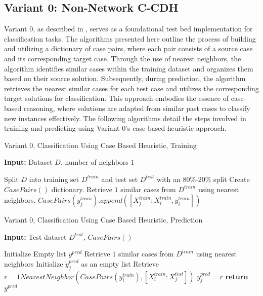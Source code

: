 \documentclass[a4paper, 12pt]{report}
\begin{document}
\subsection{Variant 0: Non-Network C-CDH}

Variant 0, as described in \cite{ye2021learning}, serves as a foundational test bed implementation for classification tasks. 
The algorithms presented here outline the process of building and utilizing a dictionary of case pairs, where each pair consists of a source case and its corresponding target case. 
Through the use of nearest neighbors, the algorithm identifies similar cases within the training dataset and organizes them based on their source solution. Subsequently, during prediction, the algorithm retrieves the nearest similar cases for each test case and utilizes the corresponding target solutions for classification. 
This approach embodies the essence of case-based reasoning, where solutions are adapted from similar past cases to classify new instances effectively. The following algorithms detail the steps involved in training and predicting using Variant 0's case-based heuristic approach.

\begin{algorithm}
    \caption{Variant 0, Classification Using Case Based Heuristic, Training}
    \label{alg:Classification_using_CBH_train_alg5}
    \textbf{Input:} Dataset $D$, number of neighbors $1$
    \begin{algorithmic}
        \State Split $D$ into training set $D^{train}$ and test set $D^{test}$ with an $80\%$-$20\%$ split
        \State Create $CasePairs()$ dictionary.
            \State Retrieve $1$ similar cases from $D^{train}$ using nearest neighbors.
                \State $CasePairs(y^{train}_j).append([X^{train}_j:X^{train}_i, y^{train}_i])$
            \EndFor
        \EndFor
    \end{algorithmic}
\end{algorithm}

\begin{algorithm}
    \caption{Variant 0, Classification Using Case Based Heuristic, Prediction}
    \label{alg:Classification_using_CBH_predict_alg6}
    \textbf{Input:} Test dataset $D^{test}$, $CasePairs()$
    \begin{algorithmic}[1]
        \State Initialize Empty list $y^{pred}$
            \State Retrieve $1$ similar cases from $D^{train}$ using nearest neighbors
            \State Initialize $y^{pred}_j$ as an empty list
                \State Retrieve $r = 1NearestNeighbor(CasePairs(y^{train}_i), [X^{train}_i:X^{test}_j])$
                \State $y^{pred}_j = r$
            \EndFor
        \EndFor
        \State \textbf{return} $y^{pred}$
    \end{algorithmic}
\end{algorithm}
\end{document}

